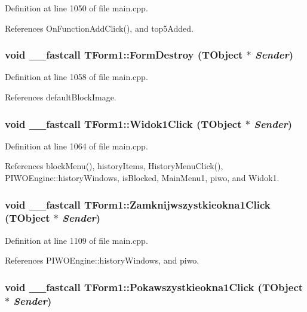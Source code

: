 Definition at line 1050 of file main.cpp.

References OnFunctionAddClick(), and top5Added.\hypertarget{classTForm1_f8af464cefaf41db4e61e56f3066638c}{
\subsubsection[FormDestroy]{\setlength{\rightskip}{0pt plus 5cm}void \_\-\_\-fastcall TForm1::FormDestroy (TObject $\ast$ {\em Sender})}}
\label{classTForm1_f8af464cefaf41db4e61e56f3066638c}




Definition at line 1058 of file main.cpp.

References defaultBlockImage.\hypertarget{classTForm1_1c822362efe786992cc566620f2364ae}{
\subsubsection[Widok1Click]{\setlength{\rightskip}{0pt plus 5cm}void \_\-\_\-fastcall TForm1::Widok1Click (TObject $\ast$ {\em Sender})}}
\label{classTForm1_1c822362efe786992cc566620f2364ae}




Definition at line 1064 of file main.cpp.

References blockMenu(), historyItems, HistoryMenuClick(), PIWOEngine::historyWindows, isBlocked, MainMenu1, piwo, and Widok1.\hypertarget{classTForm1_6fad014f2d10de311b9205f7aa47f93f}{
\subsubsection[Zamknijwszystkieokna1Click]{\setlength{\rightskip}{0pt plus 5cm}void \_\-\_\-fastcall TForm1::Zamknijwszystkieokna1Click (TObject $\ast$ {\em Sender})}}
\label{classTForm1_6fad014f2d10de311b9205f7aa47f93f}




Definition at line 1109 of file main.cpp.

References PIWOEngine::historyWindows, and piwo.\hypertarget{classTForm1_f6a2b0b43deb2c48726155f268204529}{
\subsubsection[Pokawszystkieokna1Click]{\setlength{\rightskip}{0pt plus 5cm}void \_\-\_\-fastcall TForm1::Pokawszystkieokna1Click (TObject $\ast$ {\em Sender})}}
\label{classTForm1_f6a2b0b43deb2c48726155f268204529}




